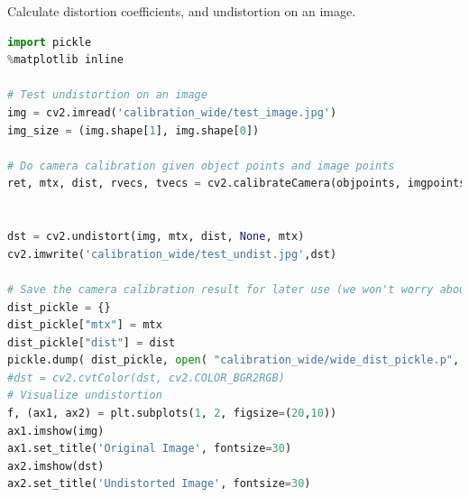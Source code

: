 \documentclass[12pt]{article}
\begin{document}
Calculate distortion coefficients, and undistortion on an image.
\begin{lstlisting}[language=Python]
import pickle
%matplotlib inline

# Test undistortion on an image
img = cv2.imread('calibration_wide/test_image.jpg')
img_size = (img.shape[1], img.shape[0])

# Do camera calibration given object points and image points
ret, mtx, dist, rvecs, tvecs = cv2.calibrateCamera(objpoints, imgpoints, img_size,None,None)


dst = cv2.undistort(img, mtx, dist, None, mtx)
cv2.imwrite('calibration_wide/test_undist.jpg',dst)

# Save the camera calibration result for later use (we won't worry about rvecs / tvecs)
dist_pickle = {}
dist_pickle["mtx"] = mtx
dist_pickle["dist"] = dist
pickle.dump( dist_pickle, open( "calibration_wide/wide_dist_pickle.p", "wb" ) )
#dst = cv2.cvtColor(dst, cv2.COLOR_BGR2RGB)
# Visualize undistortion
f, (ax1, ax2) = plt.subplots(1, 2, figsize=(20,10))
ax1.imshow(img)
ax1.set_title('Original Image', fontsize=30)
ax2.imshow(dst)
ax2.set_title('Undistorted Image', fontsize=30)
\end{lstlisting}
\end{document}
